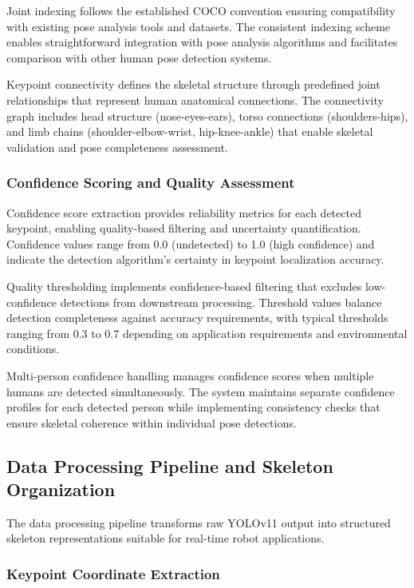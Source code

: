 Joint indexing follows the established COCO convention ensuring compatibility with existing pose analysis tools and datasets. The consistent indexing scheme enables straightforward integration with pose analysis algorithms and facilitates comparison with other human pose detection systems.

Keypoint connectivity defines the skeletal structure through predefined joint relationships that represent human anatomical connections. The connectivity graph includes head structure (nose-eyes-ears), torso connections (shoulders-hips), and limb chains (shoulder-elbow-wrist, hip-knee-ankle) that enable skeletal validation and pose completeness assessment.

\subsubsection{Confidence Scoring and Quality Assessment}

Confidence score extraction provides reliability metrics for each detected keypoint, enabling quality-based filtering and uncertainty quantification. Confidence values range from 0.0 (undetected) to 1.0 (high confidence) and indicate the detection algorithm's certainty in keypoint localization accuracy.

Quality thresholding implements confidence-based filtering that excludes low-confidence detections from downstream processing. Threshold values balance detection completeness against accuracy requirements, with typical thresholds ranging from 0.3 to 0.7 depending on application requirements and environmental conditions.

Multi-person confidence handling manages confidence scores when multiple humans are detected simultaneously. The system maintains separate confidence profiles for each detected person while implementing consistency checks that ensure skeletal coherence within individual pose detections.

\subsection{Data Processing Pipeline and Skeleton Organization}

The data processing pipeline transforms raw YOLOv11 output into structured skeleton representations suitable for real-time robot applications.

\subsubsection{Keypoint Coordinate Extraction}

